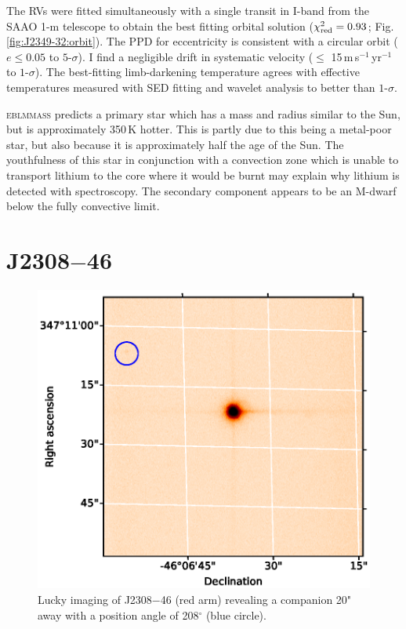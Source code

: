 The RVs were fitted simultaneously with a single transit in I-band from the SAAO 1-m telescope to obtain the best fitting orbital solution ($\chi_{\rm red}^2 = 0.93$; Fig. \ref{fig:J2349-32:orbit}). The PPD for eccentricity is consistent with a circular orbit ($e \leq 0.05$ to $5$-$\sigma$). I find a negligible drift in systematic velocity ($\leq$ 15\,m\,s$^{-1}$\,yr$^{-1}$ to $1$-$\sigma$). The best-fitting limb-darkening temperature agrees with effective temperatures measured with SED fitting and wavelet analysis to better than $1$-$\sigma$.


\textsc{eblmmass} predicts a primary star which has a mass and radius similar to the Sun, but is approximately 350\,K hotter. This is partly due to this being a metal-poor star, but also because it is approximately half the age of the Sun. The youthfulness of this star in conjunction with a convection zone which is unable to transport lithium to the core where it would be burnt may explain why lithium is detected with spectroscopy. The secondary component appears to be an M-dwarf below the fully convective limit.  %





\section{J2308$-$46}

\begin{figure}[htb]

  \centering
  \includegraphics[]{8-Results/J2308-46/lucky.eps}
  \caption{Lucky imaging of J2308$-$46 (red arm) revealing a companion 20" away with a position angle of 208$^\circ$ (blue circle).}
  \label{fig:J2308-46:lucky}
\end{figure}

